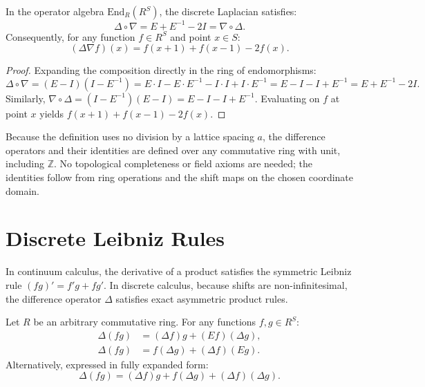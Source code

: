 \begin{proposition}
In the operator algebra $\mathrm{End}_R(R^S)$, the discrete Laplacian satisfies:
\begin{equation}
\Delta \circ \nabla = E + E^{-1} - 2I = \nabla \circ \Delta.
\end{equation}
Consequently, for any function $f \in R^S$ and point $x \in S$:
\begin{equation}
(\Delta\nabla f)(x) = f(x+1) + f(x-1) - 2f(x).
\end{equation}
\end{proposition}

\begin{proof}
Expanding the composition directly in the ring of endomorphisms:
\begin{equation}
\Delta \circ \nabla = (E - I)(I - E^{-1}) = E \cdot I - E \cdot E^{-1} - I \cdot I + I \cdot E^{-1} = E - I - I + E^{-1} = E + E^{-1} - 2I.
\end{equation}
Similarly, $\nabla \circ \Delta = (I - E^{-1})(E - I) = E - I - I + E^{-1}$. Evaluating on $f$ at point $x$ yields $f(x+1) + f(x-1) - 2f(x)$.
\end{proof}

\begin{remark}
Because the definition uses no division by a lattice spacing $a$, the difference operators and their identities are defined over any commutative ring with unit, including $\mathbb{Z}$. No topological completeness or field axioms are needed; the identities follow from ring operations and the shift maps on the chosen coordinate domain.
\end{remark}

\section{Discrete Leibniz Rules}

In continuum calculus, the derivative of a product satisfies the symmetric Leibniz rule $(f g)' = f' g + f g'$. In discrete calculus, because shifts are non-infinitesimal, the difference operator $\Delta$ satisfies exact asymmetric product rules.

\begin{theorem}
\label{thm:discrete_leibniz}
Let $R$ be an arbitrary commutative ring. For any functions $f, g \in R^S$:
\begin{align}
\Delta(f g) &= (\Delta f) g + (E f) (\Delta g), \label{eq:leibniz_1} \\
\Delta(f g) &= f (\Delta g) + (\Delta f) (E g). \label{eq:leibniz_2}
\end{align}
Alternatively, expressed in fully expanded form:
\begin{equation}
\Delta(f g) = (\Delta f) g + f (\Delta g) + (\Delta f) (\Delta g). \label{eq:leibniz_symmetric}
\end{equation}
\end{theorem}

